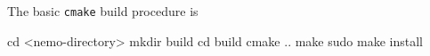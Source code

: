 \documentclass[a4paper]{article}
\newcommand{\code}[1]{\texttt{#1}}
\newcommand{\command}[1]{\texttt{#1}}
\newcommand{\library}[1]{\texttt{#1}}
\newcommand{\cpp}{C\nolinebreak\hspace{-.05em}\raisebox{.4ex}{\tiny\bf +}\nolinebreak\hspace{-.10em}\raisebox{.4ex}{\tiny\bf +}}
\begin{document}

The basic \command{cmake} build procedure is 

\begin{shell}
cd <nemo-directory>
mkdir build
cd build
cmake ..
make
sudo make install
\end{shell}













\end{document}
